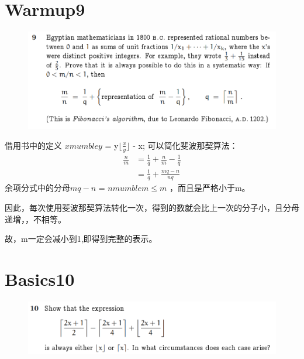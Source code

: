 \documentclass[]{article}
\begin{document}
\section*{Warmup9}
\begin{figure}[H]
    \includegraphics[scale = 0.5]{2023-03-09-10-25-44.png}
\end{figure}
借用书中的定义 $x mumble y$ = y$\lfloor \frac{x}{y} \rfloor $ - x;
可以简化斐波那契算法：
\begin{align}
    \frac{n}{m} &= \frac{1}{q} + {\frac{n}{m} - \frac{1}{q}}\\
    &= \frac{1}{q} + \frac{mq - n}{nq}
\end{align}
余项分式中的分母$mq - n$ = $n mumble m \le m$ ，而且是严格小于m。
\par 
因此，每次使用斐波那契算法转化一次，得到的数就会比上一次的分子小，且分母递增，，不相等。
\par 
故，m一定会减小到1,即得到完整的表示。

\section*{Basics10}
\begin{figure}[H]
    \includegraphics[scale = 0.5]{2023-03-09-10-26-04.png}
\end{figure}
\end{document}
